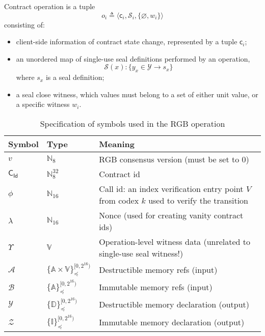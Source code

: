 \documentclass[9pt,oneside]{amsart}
\begin{document}
\begin{multicols}{2}
Contract operation is a tuple
\begin{equation}\label{eq:op}
o_i \triangleq \big\langle \mathsf{c}_i, \mathcal{S}_i, \{ \varnothing, w_i \} \big\rangle
\end{equation}
\noindent
consisting of:
\noindent
\begin{itemize}
\item client-side information of contract state change, represented by a tuple $\mathsf{c}_i$;
\item an unordered map of single-use seal definitions performed by an operation,
\noindent
\begin{equation}\label{eq:seals}
  \mathcal{S}(x): \{ y_x \in \mathcal{Y} \rightarrow s_x \}
  \end{equation}
\noindent
where $s_x$ is a seal definition;
\item a seal close witness,
which values must belong to a set of either unit value, or a specific witness $w_i$.
\end{itemize}

\end{multicols}
\begin{table}[h]
\centering
\caption{Specification of symbols used in the RGB operation}\label{tab:op}
\begin{tabular}{ l l l }
\toprule
Symbol & Type & Meaning \\
\midrule
$v$ & $\mathbb{N}_8$ & RGB consensus version (must be set to $0$) \\
$\mathsf{C_{Id}}$ & $\mathbb{N}_8^{32}$ & Contract id \\
$\phi$ & $\mathbb{N}_{16}$ & Call id: an index verification entry point $V$ from codex $k$ used to verify the transition \\
$\lambda$ & $\mathbb{N}_{16}$ & Nonce (used for creating vanity contract ids) \\
$\Upsilon$ & $\mathbb{V}$ & Operation-level witness data (unrelated to single-use seal witness!) \\
$\mathcal{A}$ & $\{\mathbb{A} \times \mathbb{V}\}_\preceq^{[0, 2^{16})}$ & Destructible memory refs (input) \\
$\mathcal{B}$ & $\{\mathbb{A}\}_\preceq^{[0, 2^{16})}$ & Immutable memory refs (input) \\
$\mathcal{Y}$ & $\{\mathbb{D}\}_\preceq^{[0, 2^{16})}$ & Destructible memory declaration (output) \\
$\mathcal{Z}$ & $\{\mathbb{I}\}_\preceq^{[0, 2^{16})}$ & Immutable memory declaration (output) \\
\bottomrule
\end{tabular}
\end{table}
\end{document}
